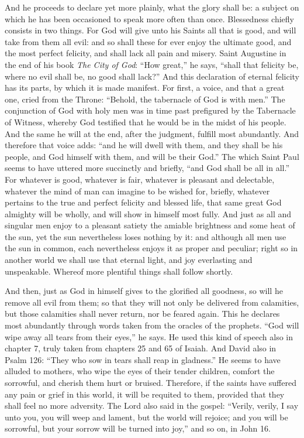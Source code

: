 And he proceeds to declare yet more plainly, what the glory shall be: a subject on which he has been occasioned to speak more often than once. Blessedness chiefly consists in two things. For God will give unto his Saints all that is good, and will take from them all evil: and so shall these for ever enjoy the ultimate good, and the most perfect felicity, and shall lack all pain and misery. Saint Augustine in the end of his book \textit{The City of God}: “How great,” he says, “shall that felicity be, where no evil shall be, no good shall lack?” And this declaration of eternal felicity has its parts, by which it is made manifest. For first, a voice, and that a great one, cried from the Throne: “Behold, the tabernacle of God is with men.” The conjunction of God with holy men was in time past prefigured by the Tabernacle of Witness, whereby God testified that he would be in the midst of his people. And the same he will at the end, after the judgment, fulfill most abundantly. And therefore that voice adds: “and he will dwell with them, and they shall be his people, and God himself with them, and will be their God.” The which Saint Paul seems to have uttered more succinctly and briefly, “and God shall be all in all.” For whatever is good, whatever is fair, whatever is pleasant and delectable, whatever the mind of man can imagine to be wished for, briefly, whatever pertains to the true and perfect felicity and blessed life, that same great God almighty will be wholly, and will show in himself most fully. And just as all and singular men enjoy to a pleasant satiety the amiable brightness and some heat of the sun, yet the sun nevertheless loses nothing by it: and although all men use the sun in common, each nevertheless enjoys it as proper and peculiar; right so in another world we shall use that eternal light, and joy everlasting and unspeakable. Whereof more plentiful things shall follow shortly.

And then, just as God in himself gives to the glorified all goodness, so will he remove all evil from them; so that they will not only be delivered from calamities, but those calamities shall never return, nor be feared again. This he declares most abundantly through words taken from the oracles of the prophets. “God will wipe away all tears from their eyes,” he says. He used this kind of speech also in chapter 7, truly taken from chapters 25 and 65 of Isaiah. And David also in Psalm 126: “They who sow in tears shall reap in gladness.” He seems to have alluded to mothers, who wipe the eyes of their tender children, comfort the sorrowful, and cherish them hurt or bruised. Therefore, if the saints have suffered any pain or grief in this world, it will be requited to them, provided that they shall feel no more adversity. The Lord also said in the gospel: “Verily, verily, I say unto you, you will weep and lament, but the world will rejoice; and you will be sorrowful, but your sorrow will be turned into joy,” and so on, in John 16.

